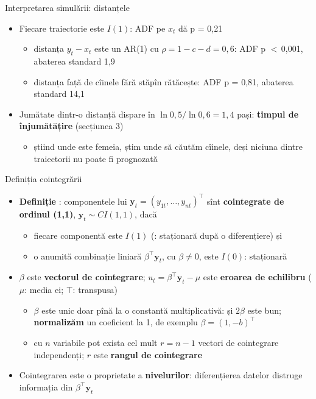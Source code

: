 \begin{frame}{Interpretarea simulării: distanțele}
\itemsize{\small}
\begin{itemize}
    \item Fiecare traiectorie este $I(1)$: ADF pe $x_t$ dă p = 0{,}21
    \begin{itemize}
        \item distanța $y_t - x_t$ este un AR(1) cu $\rho = 1 - c - d = 0{,}6$: ADF p $<$\,0{,}001, abaterea standard 1{,}9
        \item distanța față de cîinele fără stăpîn rătăcește: ADF p = 0{,}81, abaterea standard 14{,}1
    \end{itemize}
    \item Jumătate dintr-o distanță dispare în $\ln 0{,}5/\ln 0{,}6 = 1{,}4$ pași: \textbf{timpul de înjumătățire} (secțiunea 3)
    \begin{itemize}
        \item știind unde este femeia, știm unde să căutăm cîinele, deși niciuna dintre traiectorii nu poate fi prognozată
    \end{itemize}
\end{itemize}
\end{frame}

\begin{frame}{Definiția cointegrării}
\itemsize{\small}
\begin{itemize}
    \item \textbf{Definiție} : componentele lui $\mathbf y_t = (y_{1t}, \dots, y_{nt})^\top$ sînt \textbf{cointegrate de ordinul (1,1)}, $\mathbf y_t \sim CI(1,1)$, dacă
    \begin{itemize}
        \item fiecare componentă este $I(1)$ (: staționară după o diferențiere) și
        \item o anumită combinație liniară $\beta^\top \mathbf y_t$, cu $\beta \neq 0$, este $I(0)$: staționară
    \end{itemize}
    \item $\beta$ este \textbf{vectorul de cointegrare}; $u_t = \beta^\top \mathbf y_t - \mu$ este \textbf{eroarea de echilibru} ($\mu$: media ei; $\top$: transpusa)
    \begin{itemize}
        \item $\beta$ este unic doar pînă la o constantă multiplicativă: și $2\beta$ este bun; \textbf{normalizăm} un coeficient la 1, de exemplu $\beta = (1, -b)^\top$
        \item cu $n$ variabile pot exista cel mult $r = n - 1$ vectori de cointegrare independenți; $r$ este \textbf{rangul de cointegrare}
    \end{itemize}
    \item Cointegrarea este o proprietate a \textbf{nivelurilor}: diferențierea datelor distruge informația din $\beta^\top \mathbf y_t$
\end{itemize}
\end{frame}

